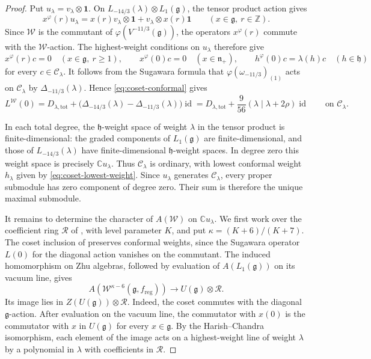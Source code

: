 \documentclass[11pt]{amsart}
\numberwithin{equation}{section}
\theoremstyle{definition}
\theoremstyle{remark}
\newcommand{\CC}{\mathbb C}
\newcommand{\ZZ}{\mathbb Z}
\newcommand{\g}{\mathfrak g}
\newcommand{\h}{\mathfrak h}
\newcommand{\nplus}{\mathfrak n_+}
\newcommand{\one}{\mathbf1}
\newcommand{\W}{\mathcal W}
\newcommand{\reg}{\mathrm{reg}}
\newcommand{\id}{\operatorname{id}}
\begin{document}
\begin{proof}
Put $u_\lambda=v_\lambda\otimes\one$. On
$L_{-14/3}(\lambda)\otimes L_1(\g)$, the tensor product action gives
\[
 x^\varphi(r)u_\lambda=x(r)v_\lambda\otimes\one+
 v_\lambda\otimes x(r)\one
 \qquad(x\in\g,\ r\in\ZZ).
\]
Since $\mathcal W$ is the commutant of $\varphi(V^{-11/3}(\g))$,
the operators $x^\varphi(r)$ commute with the
$\mathcal W$-action. The highest-weight conditions on $u_\lambda$
therefore give
\[
 x^\varphi(r)c=0\quad(x\in\g,\ r\geq1),\qquad
 x^\varphi(0)c=0\quad(x\in\nplus),\qquad
 h^\varphi(0)c=\lambda(h)c\quad(h\in\h)
\]
for every $c\in\mathcal C_\lambda$.
It follows from the Sugawara formula that
$\varphi(\omega_{-11/3})_{(1)}$ acts on $\mathcal C_\lambda$
by $\Delta_{-11/3}(\lambda)$. Hence \eqref{eq:coset-conformal} gives
\[
 L^{\mathcal W}(0)
 =D_{\lambda,\mathrm{tot}}
  +\bigl(\Delta_{-14/3}(\lambda)-\Delta_{-11/3}(\lambda)\bigr)\id
 =D_{\lambda,\mathrm{tot}}
  +\frac9{56}(\lambda\mid\lambda+2\rho)\id
 \qquad\text{on }\mathcal C_\lambda.
\]

In each total degree, the $\h$-weight space of weight $\lambda$
in the tensor product is finite-dimensional: the graded components
of $L_1(\g)$ are finite-dimensional, and those of
$L_{-14/3}(\lambda)$ have finite-dimensional $\h$-weight spaces.
In degree zero this weight space is precisely $\CC u_\lambda$.
Thus $\mathcal C_\lambda$ is ordinary, with lowest conformal weight
$h_\lambda$ given by \eqref{eq:coset-lowest-weight}.
Since $u_\lambda$ generates $\mathcal C_\lambda$, every proper
submodule has zero component of degree zero. Their sum is therefore
the unique maximal submodule.

It remains to determine the character of $A(\mathcal W)$ on
$\CC u_\lambda$. We first work over the coefficient ring
$\mathscr R$ of \cite[Definition~2.4]{ACL}, with level parameter $K$,
and put $\kappa=(K+6)/(K+7)$. The coset inclusion of
\cite[Theorem~8.7]{ACL} preserves conformal weights, since the
Sugawara operator $L(0)$ for the diagonal action vanishes on the
commutant. The induced homomorphism on Zhu algebras, followed by
evaluation of $A(L_1(\g))$ on its vacuum line, gives
\[
 A(\W^{\kappa-6}(\g,f_{\reg}))
 \longrightarrow U(\g)\otimes\mathscr R.
\]
Its image lies in $Z(U(\g))\otimes\mathscr R$. Indeed, the coset
commutes with the diagonal $\g$-action. After evaluation on the vacuum
line, the commutator with $x(0)$ is the commutator with $x$ in $U(\g)$
for every $x\in\g$. By the Harish--Chandra
isomorphism, each element of the image acts on a highest-weight
line of weight $\lambda$ by a polynomial in $\lambda$ with
coefficients in $\mathscr R$.


\end{proof}
\end{document}
